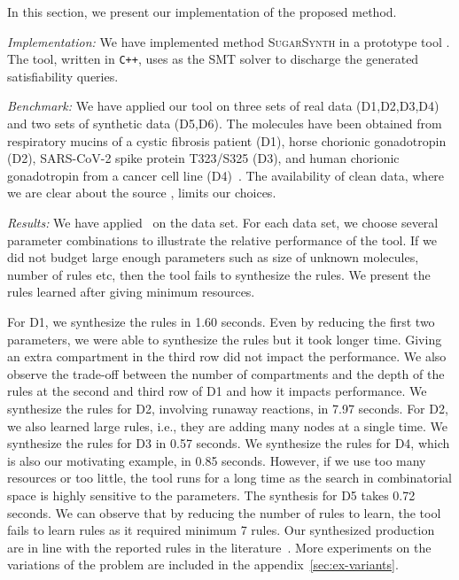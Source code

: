 In this section, we  present our implementation of the proposed method.

{\em Implementation:} 
We have implemented method \textsc{SugarSynth} in a prototype tool {\ourtool}.
%
The tool, written in {\tt C++}, uses {\zthree}\cite{z3} as the SMT solver
to discharge the generated satisfiability queries.
%


{\em Benchmark: }
We have applied our tool on three sets of real data (D1,D2,D3,D4) and two sets of synthetic data (D5,D6). The molecules have been obtained from
respiratory mucins of a cystic fibrosis patient (D1),
horse chorionic gonadotropin (D2), SARS-CoV-2 spike protein T323/S325 (D3), and human chorionic gonadotropin from a cancer cell line (D4)~\cite{Jaiman2018,10.1093/glycob/cwaa042}.
The availability of clean data, where we are clear about the source
, limits our choices.

% 



{\em Results:}
We have applied \ourtool~on the data set. For each data set, we choose several
parameter combinations to illustrate the relative performance of the tool.
If we did not budget large enough parameters such as size of unknown molecules, number of rules etc, then the tool fails to
synthesize the rules.
We present the rules learned after giving minimum resources.

For D1, we synthesize the rules in 1.60 seconds. Even by reducing the first two parameters, we were able to synthesize the rules but it took longer time.
Giving an extra compartment in the third row did not impact the performance.  We also observe the trade-off between the number of compartments
and the depth of the rules at the second and third row of D1 and how it impacts performance.
We synthesize the rules for D2, involving runaway reactions,  in 7.97 seconds.
For D2, we also learned large rules, i.e., they are adding many nodes at a single time.
We synthesize the rules for D3 in 0.57 seconds. We synthesize the rules for D4, which is also our motivating example, in 0.85 seconds.
However, if we use too many resources or too little, the tool runs for a long time as the search in combinatorial space is highly sensitive to the parameters.
The synthesis for D5 takes 0.72 seconds. We can observe that by reducing the number of rules to learn, the tool fails to learn rules as it required minimum 7 rules.
Our synthesized production are in line with the reported rules
in the literature~\cite{Jaiman2018}.
More experiments on the variations of the problem
are included in the appendix~\ref{sec:ex-variants}. %

